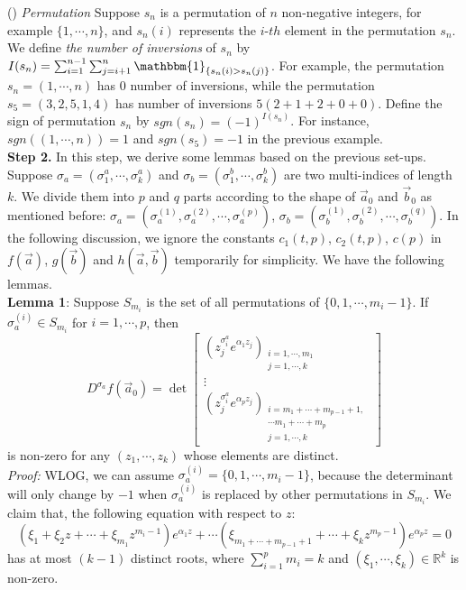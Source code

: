 \documentclass[12pt]{article}
\begin{document}
() \emph{Permutation} Suppose $s_{n}$ is a permutation of $n$ non-negative integers, for example $\{1,\cdots,n\}$, and $s_{n}(i)$ represents the $i$-$th$ element in the permutation $s_{n}$. We define \emph{the number of inversions} of $s_{n}$ by $I(s_{n})=\sum_{i=1}^{n-1}\sum_{j=i+1}^{n}\mathbbm{1}_{\{s_{n}(i)>s_{n}(j)\}}$. For example, the permutation $s_{n}=(1,\cdots,n)$ has $0$ number of inversions, while the permutation $s_{5}=(3,2,5,1,4)$ has number of inversions $5(2+1+2+0+0)$. Define the sign of permutation $s_{n}$ by $sgn(s_{n})=(-1)^{I(s_{n})}$. For instance, $sgn((1,\cdots,n))=1$ and $sgn(s_{5})=-1$ in the previous example.\\
\textbf{Step 2. }In this step, we derive some lemmas based on the previous set-ups. Suppose $\sigma_{a}=(\sigma_{1}^{a},\cdots,\sigma_{k}^{a})$ and $\sigma_{b}=(\sigma_{1}^{b},\cdots,\sigma_{k}^{b})$ are two multi-indices of length $k$. We divide them into $p$ and $q$ parts according to the shape of $\vec{a}_{0}$ and $\vec{b}_{0}$ as mentioned before: $\sigma_{a}=(\sigma^{(1)}_{a},\sigma^{(2)}_{a},\cdots,\sigma^{(p)}_{a})$, $\sigma_{b}=(\sigma^{(1)}_{b},\sigma^{(2)}_{b},\cdots,\sigma^{(q)}_{b})$. In the following discussion, we ignore the constants $c_{1}(t,p)$, $c_{2}(t,p)$, $c(p)$ in $f(\vec{a})$, $g(\vec{b})$ and $h(\vec{a},\vec{b})$ temporarily for simplicity. We have the following lemmas.\\
\textbf{Lemma 1}: Suppose $S_{m_i}$ is the set of all permutations of $\{0,1,\cdots,m_{i}-1\}$. If $\sigma_{a}^{(i)}\in S_{m_i}$ for $i=1,\cdots,p$, then 
\[ D^{\sigma_{a}}f(\vec{a}_{0})= \det
	\left[ \begin{array}{ccc}
		(z_{j}^{\sigma_{i}^{a}}e^{\alpha_{1}z_{j}})_{\substack{i=1,\cdots,m_{1}\\j=1,\cdots,k}}\\
	\vdots\\
	(z_{j}^{\sigma_{i}^{a}}e^{\alpha_{p}z_{j}})_{\substack{i=m_1+\cdots+m_{p-1}+1,\\ \cdots m_{1}+\cdots +m_{p} \\j=1,\cdots,k}}
	\end{array}
	\right]
\]
is non-zero for any $(z_{1},\cdots,z_{k})$ whose elements are distinct.\\
\emph{Proof: }WLOG, we can assume $\sigma_{a}^{(i)}=\{0,1,\cdots,m_{i}-1\}$, because the determinant will only change by $-1$ when $\sigma_{a}^{(i)}$ is replaced by other permutations in $S_{m_i}$. We claim that, the following equation with respect to $z$:
$$(\xi_{1}+\xi_{2}z+\cdots+\xi_{m_1}z^{m_{i}-1})e^{\alpha_{1}z}+\cdots(\xi_{m_{1}+\cdots+m_{p-1}+1}+\cdots+\xi_{k}z^{m_{p}-1})e^{\alpha_{p}z}=0$$ has at most $(k-1)$ distinct roots, where $\sum_{i=1}^{p}m_i=k$ and $(\xi_{1},\cdots,\xi_{k})\in\mathbb{R}^{k}$ is non-zero.\\
\end{document}
